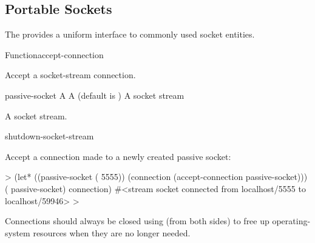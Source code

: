 \documentclass[10pt,twoside,english,pdftex]{article}
\begin{document}

\T\markright{}%
\T\pagestyle{plain}
\T\clearpage
\W{}
\T\pagestyle{fancy}
\T\thispagestyle{fancybottom}
\T\global\def\fnlastname{ }%
\subsection{Portable Sockets}
\label{sec:portablesockets}%

%
%
%
The   provides a uniform interface to
commonly used socket entities.

\W\entities
\T\clearpage


\begin{functiondoc}{Function}{accept-connection}{
    }
%
%
%

\fnsyntax

\fnpurpose Accept a socket-stream connection.

\fnpackage {}

\fnmodule {}

\fnargs
\begin{args}{passive-socket}
 A 
\arg[wait] A  (default is )
 A socket stream
\end{args}

\fnreturns A socket stream.

\begin{alsos}{shutdown-socket-stream}
\end{alsos}

%
%
\fnexample
Accept a connection made to a newly created passive socket:
%
\W\supp
\begin{example}
  > (let* ((passive-socket ( 5555))
           (connection (accept-connection passive-socket)))
       ( passive-socket)
       connection)
  #<stream socket connected from localhost/5555 to localhost/59946>
  >
\end{example}

\fnnote Connections should always be closed using  (from
both sides) to free up operating-system resources when they are no longer
needed.

\end{functiondoc}
\end{document}
